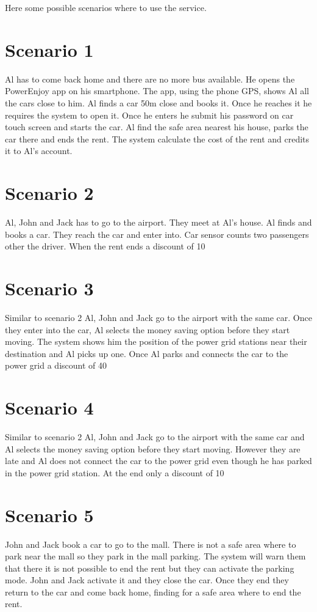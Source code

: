 Here some possible scenarios where to use the service.
\section{Scenario 1}
Al has to come back home and there are no more bus available. He opens the PowerEnjoy app on his smartphone. The app, using the phone GPS, shows Al all the cars close to him. Al finds a car 50m close and books it. Once he reaches it he requires the system to open it. Once he enters he submit his password on car touch screen and starts the car. Al find the safe area nearest his house, parks the car there and ends the rent. The system calculate the cost of the rent and credits it to Al's account.
\section{Scenario 2}
Al, John and Jack has to go to the airport. They meet at Al's house. Al finds and books a car. They reach the car and enter into. Car sensor counts two passengers other the driver. When the rent ends a discount of 10%
\section{Scenario 3}
Similar to scenario 2 Al, John and Jack go to the airport with the same car. Once they enter into the car, Al selects the money saving option before they start moving. The system shows him the position of the power grid stations near their destination and Al picks up one. Once Al parks and connects the car to the power grid a discount of 40%
\section{Scenario 4}
Similar to scenario 2 Al, John and Jack go to the airport with the same car and Al selects the money saving option before they start moving. However they are late and Al does not connect the car to the power grid even though he has parked in the power grid station. At the end only a discount of 10%
\section{Scenario 5}
John and Jack book a car to go to the mall. There is not a safe area where to park near the mall so they park in the mall parking. The system will warn them that there it is not possible to end the rent but they can activate the parking mode. John and Jack activate it and they close the car. Once they end they return to the car and come back home, finding for a safe area where to end the rent.
